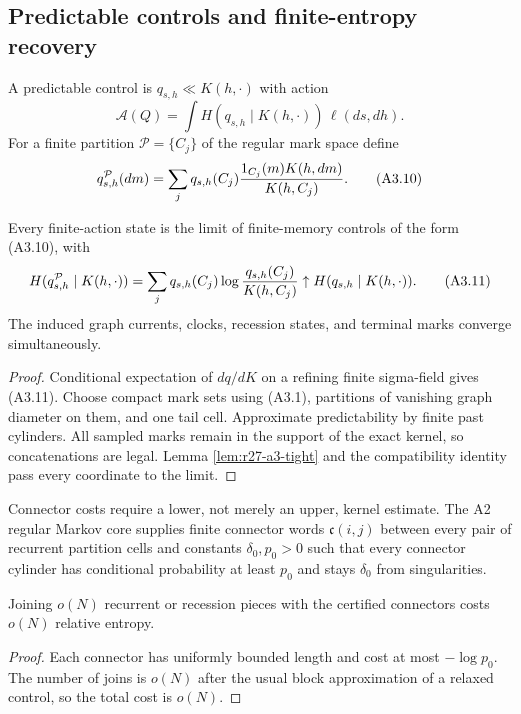 \subsection{Predictable controls and finite-entropy recovery}

A predictable control is $q_{s,h}\ll K(h,\cdot)$ with action
\[
 \mathcal A(Q)=\int H(q_{s,h}\mid K(h,\cdot))\,\ell(ds,dh).               \tag{A3.9}
\]
For a finite partition $\mathcal P=\{C_j\}$ of the regular mark space define
\[
 q^{\mathcal P}_{s,h}(dm)
 =\sum_j q_{s,h}(C_j)
 {1_{C_j}(m)K(h,dm)\over K(h,C_j)}.                       \tag{A3.10}
\]

\begin{lemma}
\label{lem:r27-a3-recovery}
Every finite-action state is the limit of finite-memory controls of the form
(A3.10), with
\[
 H(q^{\mathcal P}_{s,h}\mid K(h,\cdot))
 =\sum_jq_{s,h}(C_j)\log{q_{s,h}(C_j)\over K(h,C_j)}
 \uparrow H(q_{s,h}\mid K(h,\cdot)).                      \tag{A3.11}
\]
The induced graph currents, clocks, recession states, and terminal marks
converge simultaneously.
\end{lemma}

\begin{proof}
Conditional expectation of $dq/dK$ on a refining finite sigma-field gives
(A3.11).  Choose compact mark sets using (A3.1), partitions of vanishing graph
diameter on them, and one tail cell.  Approximate predictability by finite
past cylinders.  All sampled marks remain in the support of the exact kernel,
so concatenations are legal.  Lemma \ref{lem:r27-a3-tight} and the
compatibility identity pass every coordinate to the limit.
\end{proof}

Connector costs require a lower, not merely an upper, kernel estimate.  The
A2 regular Markov core supplies finite connector words
$\mathfrak c(i,j)$ between every pair of recurrent partition cells and
constants $\delta_0,p_0>0$ such that every connector cylinder has conditional
probability at least $p_0$ and stays $\delta_0$ from singularities.

\begin{lemma}
\label{lem:r27-a3-connector}
Joining $o(N)$ recurrent or recession pieces with the certified connectors
costs $o(N)$ relative entropy.
\end{lemma}

\begin{proof}
Each connector has uniformly bounded length and cost at most
$-\log p_0$.  The number of joins is $o(N)$ after the usual block
approximation of a relaxed control, so the total cost is $o(N)$.
\end{proof}

